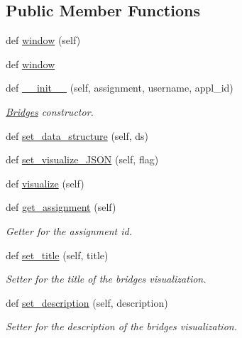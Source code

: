 \subsection*{Public Member Functions}
\begin{DoxyCompactItemize}
\item 
def \mbox{\hyperlink{classbridges_1_1bridges_1_1_bridges_a1340374df9e4aa1490d9cd9be2b0e918}{window}} (self)
\item 
def \mbox{\hyperlink{classbridges_1_1bridges_1_1_bridges_ab434ee3f7b3b8c9eb4f8a07d97789a82}{window}}
\item 
def \mbox{\hyperlink{classbridges_1_1bridges_1_1_bridges_af174072883f6f269a9fe7cc02e12c276}{\+\_\+\+\_\+init\+\_\+\+\_\+}} (self, assignment, username, appl\+\_\+id)
\begin{DoxyCompactList}\small\item\em \mbox{\hyperlink{classbridges_1_1bridges_1_1_bridges}{Bridges}} constructor. \end{DoxyCompactList}\item 
def \mbox{\hyperlink{classbridges_1_1bridges_1_1_bridges_a868f02fa66c87c1a1fc7bd6fbc799291}{set\+\_\+data\+\_\+structure}} (self, ds)
\item 
def \mbox{\hyperlink{classbridges_1_1bridges_1_1_bridges_ab50d018b5178ca33de24157b7b6de285}{set\+\_\+visualize\+\_\+\+J\+S\+ON}} (self, flag)
\item 
def \mbox{\hyperlink{classbridges_1_1bridges_1_1_bridges_a3c1321f8be7b249639a47eba10b67c70}{visualize}} (self)
\item 
def \mbox{\hyperlink{classbridges_1_1bridges_1_1_bridges_a1e7bd56f6a3beb03c91fc989cf3f7eb8}{get\+\_\+assignment}} (self)
\begin{DoxyCompactList}\small\item\em Getter for the assignment id. \end{DoxyCompactList}\item 
def \mbox{\hyperlink{classbridges_1_1bridges_1_1_bridges_a3b0c629c1ae0beaac05fa9d90846c423}{set\+\_\+title}} (self, title)
\begin{DoxyCompactList}\small\item\em Setter for the title of the bridges visualization. \end{DoxyCompactList}\item 
def \mbox{\hyperlink{classbridges_1_1bridges_1_1_bridges_aba86088c031b505bbe88dbc530bf1331}{set\+\_\+description}} (self, description)
\begin{DoxyCompactList}\small\item\em Setter for the description of the bridges visualization. \end{DoxyCompactList}\item 

\end{DoxyCompactItemize}
